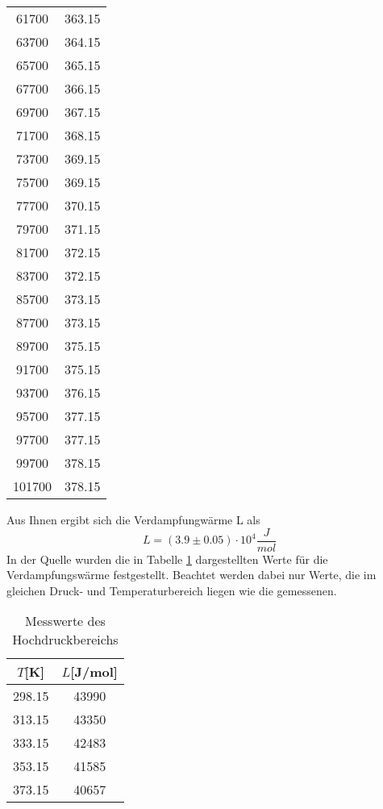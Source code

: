 \begin{table}[H]
\begin{tabular}{c c}
      61700 &   363.15 \\ 
      63700 &   364.15 \\ 
      65700 &   365.15 \\ 
      67700 &   366.15 \\ 
      69700 &   367.15 \\ 
      71700 &   368.15 \\ 
      73700 &   369.15 \\ 
      75700 &   369.15 \\ 
      77700 &   370.15 \\ 
      79700 &   371.15 \\ 
      81700 &   372.15 \\ 
      83700 &   372.15 \\ 
      85700 &   373.15 \\ 
      87700 &   373.15 \\
      89700 &   375.15 \\ 
      91700 &   375.15 \\ 
      93700 &   376.15 \\ 
      95700 &   377.15 \\ 
      97700 &   377.15 \\ 
      99700 &   378.15 \\ 
      101700 &   378.15 \\ 
    \bottomrule
    \end{tabular}
\end{table}
Aus Ihnen ergibt sich die Verdampfungwärme L als 
\begin{equation*}
    L= (3.9 \pm 0.05) \cdot 10^4 \dfrac{J}{mol}
\end{equation*}
In der Quelle \cite{Verdampfungwärme} wurden die in Tabelle \ref{tab:ndrtheo} dargestellten Werte
für die Verdampfungswärme festgestellt. Beachtet werden dabei nur Werte, die im gleichen 
Druck- und Temperaturbereich liegen wie die gemessenen.
\begin{table}[H]
\centering
   \caption{Messwerte des Hochdruckbereichs}
   \label{tab:ndrtheo}
   \begin{tabular}{c c}
   \toprule
    $T$[K] & $L$[J/mol] \\
    \midrule
    298.15 &    43990 \\ 
    313.15 &    43350 \\   
    333.15 &    42483 \\   
    353.15 &    41585 \\   
    373.15 &    40657 \\   
    \bottomrule
    \end{tabular}
\end{table}
